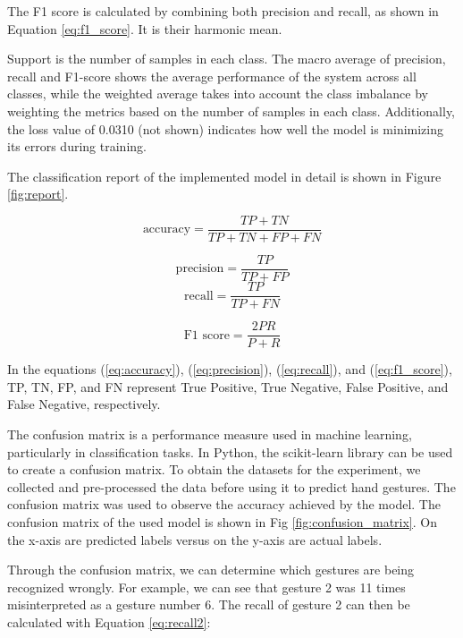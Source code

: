 The F1 score is calculated by combining both precision and recall, as shown in Equation \ref{eq:f1_score}. It is their harmonic mean.

Support is the number of samples in each class. 
The macro average of precision, recall and F1-score shows the average performance of the system across all classes, while the weighted average takes into account the class imbalance by weighting the metrics based on the number of samples in each class.
Additionally, the loss value of 0.0310 (not shown) indicates how well the model is minimizing its errors during training.

The classification report of the implemented model in detail is shown in Figure \ref{fig:report}. 


\begin{equation}
	\text{accuracy} = \frac{TP + TN}{TP + TN + FP +FN}
 \label{eq:accuracy}
\end{equation}

\begin{equation}
	\text{precision} = \frac{TP}{TP + FP}
  \label{eq:precision}
\end{equation}
\begin{equation}
	\text{recall} = \frac{TP}{TP + FN}
  \label{eq:recall}
\end{equation}

\begin{equation}
	\text{F1 score} = \frac{2 P  R}{P+ R} 
 \label{eq:f1_score}
\end{equation}

In the equations (\ref{eq:accuracy}), (\ref{eq:precision}), (\ref{eq:recall}), and (\ref{eq:f1_score}), TP, TN, FP, and FN represent True Positive, True Negative, False Positive,
and False Negative, respectively.

The confusion matrix is a performance measure used in machine learning, particularly in classification tasks. In Python, the scikit-learn library can be used to create a confusion matrix. To obtain the datasets for the experiment, we collected and pre-processed the data before using it to predict hand gestures. The confusion matrix was used to observe the accuracy achieved by the model. The confusion matrix of the used model is shown in Fig \ref{fig:confusion_matrix}. On the x-axis are predicted labels versus on the y-axis are actual labels.


Through the confusion matrix, we can determine which gestures are being recognized wrongly. For example, we can see that gesture 2 was 11 times misinterpreted as a gesture number 6. The recall of gesture 2 can then be calculated with Equation \ref{eq:recall2}:

